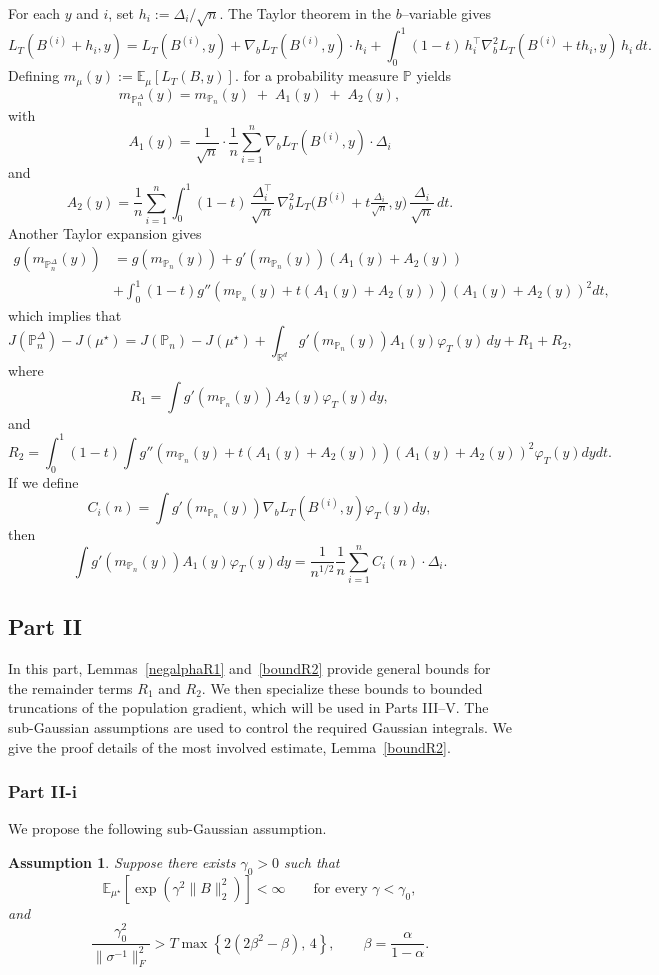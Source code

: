 \documentclass[11pt]{article}
\newtheorem{assumption}{Assumption}
\theoremstyle{definition}
\newcommand{\E}{\mathbb{E}}
\begin{document}
For each $y$ and $i$, set $h_i:=\Delta_i/\sqrt n$.
The Taylor theorem in the $b$--variable gives
\[
L_T(B^{(i)}+h_i,y)
= L_T(B^{(i)},y)+\nabla_b L_T(B^{(i)},y)\!\cdot\!h_i
+\int_0^1(1-t)\,h_i^\top \nabla_b^2 L_T(B^{(i)}+t h_i,y)\,h_i\,dt.
\]
Defining $m_\mu(y):=\E_\mu[L_T(B,y)].$ for a probability measure $\mathbb{P}$ yields
\[
m_{\mathbb{P}_n^\Delta}(y)
= m_{\mathbb{P}_n}(y)\;+\;A_1(y)\;+\;A_2(y),
\]
with
\[
A_1(y)=\frac{1}{\sqrt n}\cdot\frac1n\sum_{i=1}^n \nabla_b L_T(B^{(i)},y)\cdot \Delta_i
\]
and
\[
A_2(y)=\frac1n\sum_{i=1}^n\int_0^1(1-t)\,\frac{\Delta_i^\top}{\sqrt n}\,
\nabla_b^2 L_T\!\Big(B^{(i)}+t\tfrac{\Delta_i}{\sqrt n},y\Big)\,\frac{\Delta_i}{\sqrt n}\,dt.
\]
Another Taylor expansion gives 
\begin{align*}
    g(m_{\mathbb{P}_n^\Delta}(y))& = g(m_{\mathbb{P}_n}(y)) + g'(m_{\mathbb{P}_n}(y))(A_1(y) + A_2(y))\\ 
    &+ \int_0^1 (1-t)g''(m_{\mathbb{P}_n}(y) + t(A_1(y) + A_2(y)))(A_1(y) + A_2(y))^2dt ,
\end{align*}which implies that 
\begin{equation}\label{eq:Taylor_final}
J(\mathbb P_n^\Delta)-J(\mu^\star)
=
J(\mathbb P_n)-J(\mu^\star)
+
\int_{\mathbb R^d}
g'\!\left(m_{\mathbb P_n}(y)\right)
A_1(y)\varphi_T(y)\,dy
+
R_1+R_2,
\end{equation}
where $$R_1 = \int g'(m_{\mathbb{P}_n}(y))A_2(y)\varphi_T(y)dy,$$
and $$R_2 = \int_0^1 (1-t)\int g''(m_{\mathbb{P}_n}(y) + t(A_1(y) + A_2(y)))(A_1(y) + A_2(y))^2\varphi_T(y)dydt.$$
If we define $$C_i(n) = \int g'(m_{\mathbb{P}_n}(y))\nabla_bL_T(B^{(i)},y)\varphi_T(y)dy,$$
then $$\int g'(m_{\mathbb{P}_n}(y))A_1(y)\varphi_T(y)dy = \frac{1}{n^{1/2}}\frac{1}{n}\sum_{i = 1}^n C_i(n) \cdot \Delta_i.$$

\subsection{Part II}
In this part, Lemmas~\ref{negalphaR1} and~\ref{boundR2} provide
general bounds for the remainder terms $R_1$ and $R_2$. We then
specialize these bounds to bounded truncations of the population
gradient, which will be used in Parts III--V. The sub-Gaussian
assumptions are used to control the required Gaussian integrals. We
give the proof details of the most involved estimate,
Lemma~\ref{boundR2}.

\subsubsection{Part II-i}
We propose the following sub-Gaussian assumption. 
\begin{assumption}\label{Lemma12ass}
Suppose there exists $\gamma_0>0$ such that
\[
\E_{\mu^\star}
\left[
\exp\!\left(\gamma^2\|B\|_2^2\right)
\right]
<\infty
\qquad
\text{for every }\gamma<\gamma_0,
\]
and
\[
\frac{\gamma_0^2}{\|\sigma^{-1}\|_F^2}
>
T\max\left\{
2(2\beta^2-\beta),\,4
\right\},
\qquad
\beta=\frac{\alpha}{1-\alpha}.
\]
\end{assumption}
\end{document}
